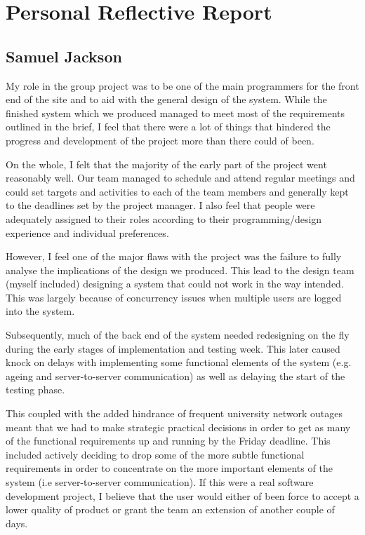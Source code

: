 \documentclass{article}
\begin{document}
\section*{Personal Reflective Report}
\subsection*{Samuel Jackson}
My role in the group project was to be one of the main programmers for the front end of the site and to aid with the general design of the system. While the finished system which we produced managed to meet most of the requirements outlined in the brief, I feel that there were a lot of things that hindered the progress and development of the project more than there could of been.

On the whole, I felt that the majority of the early part of the project went reasonably well. Our team managed to schedule and attend regular meetings and could set targets and activities to each of the team members and generally kept to the deadlines set by the project manager. I also feel that people were adequately assigned to their roles according to their programming/design experience and individual preferences.

However, I feel one of the major flaws with the project was the failure to fully analyse the implications of the design we produced. This lead to the design team (myself included) designing a system that could not work in the way intended. This was largely because of concurrency issues when multiple users are logged into the system.

Subsequently, much of the back end of the system needed redesigning on the fly during the early stages of implementation and testing week. This later caused knock on delays with implementing some functional elements of the system (e.g. ageing and server-to-server communication) as well as delaying the start of the testing phase.

This coupled with the added hindrance of frequent university network outages meant that we had to make strategic practical decisions in order to get as many of the functional requirements up and running by the Friday deadline. This included actively deciding to drop some of the more subtle functional requirements in order to concentrate on the more important elements of the system (i.e server-to-server communication). If this were a real software development project, I believe that the user would either of been force to accept a lower quality of product or grant the team an extension of another couple of days.
\end{document}

